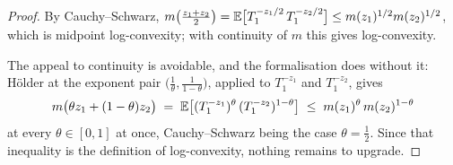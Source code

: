 \begin{proof}
\leanok
By Cauchy--Schwarz,
$m\bigl(\tfrac{z_1+z_2}{2}\bigr) = \mathbb{E}\bigl[T_1^{-z_1/2}\,T_1^{-z_2/2}\bigr]
\le m(z_1)^{1/2} m(z_2)^{1/2}$, which is midpoint log-convexity; with continuity of $m$ this
gives log-convexity.

The appeal to continuity is avoidable, and the formalisation does without it: H\"older at the
exponent pair $\bigl(\tfrac1\theta, \tfrac1{1-\theta}\bigr)$, applied to $T_1^{-z_1}$ and
$T_1^{-z_2}$, gives
\[
  m\bigl(\theta z_1 + (1-\theta) z_2\bigr)
    \;=\; \mathbb{E}\bigl[(T_1^{-z_1})^{\theta}\,(T_1^{-z_2})^{1-\theta}\bigr]
    \;\le\; m(z_1)^{\theta}\,m(z_2)^{1-\theta}
\]
at every $\theta \in [0,1]$ at once, Cauchy--Schwarz being the case $\theta = \tfrac12$. Since
that inequality is the definition of log-convexity, nothing remains to upgrade.
\end{proof}

